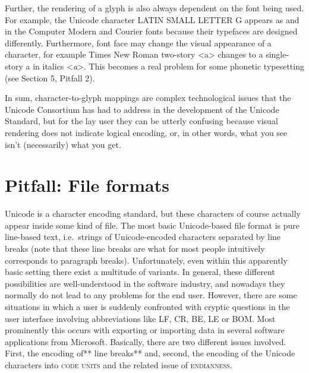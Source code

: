 Further, the rendering of a glyph is also always dependent on the font being used. For example, the Unicode character LATIN SMALL LETTER G appears as and in the Computer Modern and Courier fonts because their typefaces are designed differently. Furthermore, font face may change the visual appearance of a character, for example Times New Roman two-story <a> changes to a single-story a in italics <\emph{a}>. This becomes a real problem for some phonetic typesetting (see Section 5, Pitfall 2).

In sum, character-to-glyph mappings are complex technological issues that the Unicode Consortium has had to address in the development of the Unicode Standard, but for the lay user they can be utterly confusing because visual rendering does not indicate logical encoding, or, in other words, what you see isn't (necessarily) what you get.

\section{Pitfall: File formats}
\label{pitfall-file-formats}

Unicode is a character encoding standard, but these characters of course actually appear inside some kind of file. The most basic Unicode-based file format is pure line-based text, i.e.~strings of Unicode-encoded characters separated by line breaks (note that these line breaks are what for most people intuitively corresponds to paragraph breaks). Unfortunately, even within this apparently basic setting there exist a multitude of variants. In general, these different possibilities are well-understood in the software industry, and nowadays they normally do not lead to any problems for the end user. However, there are some situations in which a user is suddenly confronted with cryptic questions in the user interface involving abbreviations like LF, CR, BE, LE or BOM. Most prominently this occurs with exporting or importing data in several software applications from Microsoft. Basically, there are two different issues involved. First, the encoding of** line breaks** and, second, the encoding of the Unicode characters into \textsc{code units} and the related issue of \textsc{endianness}.

